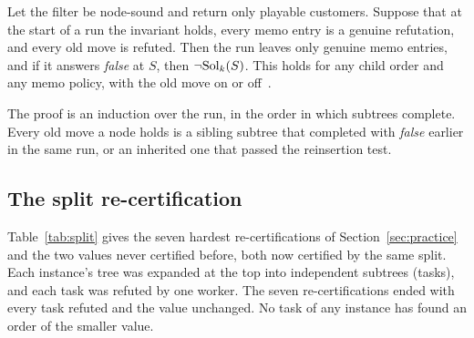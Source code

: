\begin{theorem}\label{thm:runs}
Let the filter be node-sound and return only playable customers. Suppose that
at the start of a run the invariant holds, every memo entry is a genuine
refutation, and every old move is refuted. Then the run leaves only genuine memo entries, and if
it answers \emph{false} at $S$, then $\neg\mathrm{Sol}_k(S)$. This holds for any child
order and any memo policy, with the old move on or off~.
\end{theorem}
The proof is an induction over the run, in the order in which subtrees complete.
Every old move a node holds is a sibling subtree that completed with \emph{false}
earlier in the same run, or an inherited one that passed the reinsertion test.

\subsection{The split re-certification}
\label{app:split}

Table~\ref{tab:split} gives the seven hardest re-certifications of
Section~\ref{sec:practice} and the two values never certified before, both now certified by the same split. Each instance's tree was expanded at the top into
independent subtrees (tasks), and each task was refuted by one worker. The
seven re-certifications ended with every task refuted and the value unchanged.
No task of any instance has found an order of the smaller value.

\begin{table}[h]
\centering\small
\caption{All seven hardest values re-certify unchanged, at 18 to 369
core-hours each. The two values never certified before, 21 for \texttt{Random-125-125-2-3\_0}
and 25 for \texttt{Random-125-125-2-2\_0}, are now certified. \emph{Value}: the stored optimum;
\emph{$k$}: the value minus one, which must be refuted. }
\label{tab:split}

\end{table}
